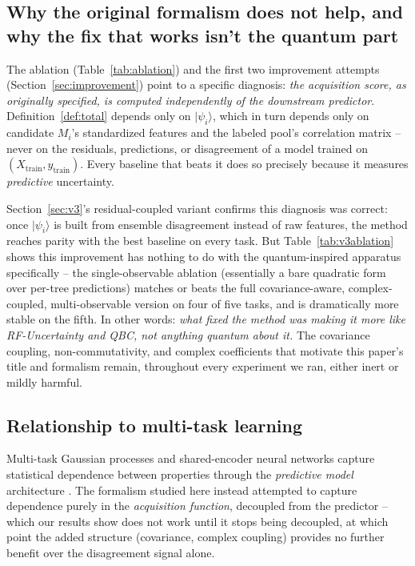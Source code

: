 \documentclass[conference]{IEEEtran}
\begin{document}
\subsection{Why the original formalism does not help, and why the fix that works isn't the quantum part}

The ablation (Table~\ref{tab:ablation}) and the first two improvement attempts (Section~\ref{sec:improvement}) point to a specific diagnosis: \emph{the acquisition score, as originally specified, is computed independently of the downstream predictor}. Definition~\ref{def:total} depends only on $|\psi_i\rangle$, which in turn depends only on candidate $M_i$'s standardized features and the labeled pool's correlation matrix -- never on the residuals, predictions, or disagreement of a model trained on $(X_{\mathrm{train}}, y_{\mathrm{train}})$. Every baseline that beats it does so precisely because it measures \emph{predictive} uncertainty.

Section~\ref{sec:v3}'s residual-coupled variant confirms this diagnosis was correct: once $|\psi_i\rangle$ is built from ensemble disagreement instead of raw features, the method reaches parity with the best baseline on every task. But Table~\ref{tab:v3ablation} shows this improvement has nothing to do with the quantum-inspired apparatus specifically -- the single-observable ablation (essentially a bare quadratic form over per-tree predictions) matches or beats the full covariance-aware, complex-coupled, multi-observable version on four of five tasks, and is dramatically more stable on the fifth. In other words: \emph{what fixed the method was making it more like RF-Uncertainty and QBC, not anything quantum about it.} The covariance coupling, non-commutativity, and complex coefficients that motivate this paper's title and formalism remain, throughout every experiment we ran, either inert or mildly harmful.

\subsection{Relationship to multi-task learning}

Multi-task Gaussian processes and shared-encoder neural networks capture statistical dependence between properties through the \emph{predictive model} architecture \cite{rasmussen2006gaussian}. The formalism studied here instead attempted to capture dependence purely in the \emph{acquisition function}, decoupled from the predictor -- which our results show does not work until it stops being decoupled, at which point the added structure (covariance, complex coupling) provides no further benefit over the disagreement signal alone.
\end{document}
